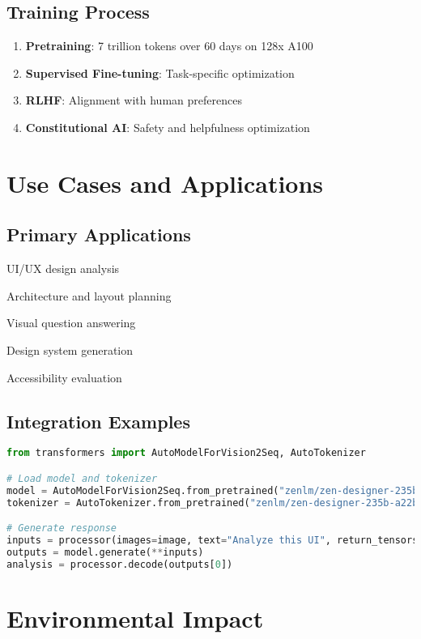 \documentclass[11pt,a4paper]{article}
\begin{document}
\subsection{Training Process}
\begin{enumerate}
    \item \textbf{Pretraining}: 7 trillion tokens over 60 days on 128x A100
    \item \textbf{Supervised Fine-tuning}: Task-specific optimization
    \item \textbf{RLHF}: Alignment with human preferences
    \item \textbf{Constitutional AI}: Safety and helpfulness optimization
\end{enumerate}

\section{Use Cases and Applications}

\subsection{Primary Applications}
\item UI/UX design analysis
\item Architecture and layout planning
\item Visual question answering
\item Design system generation
\item Accessibility evaluation

\subsection{Integration Examples}

\begin{lstlisting}[language=Python, caption=Basic Usage Example]
from transformers import AutoModelForVision2Seq, AutoTokenizer

# Load model and tokenizer
model = AutoModelForVision2Seq.from_pretrained("zenlm/zen-designer-235b-a22b-thinking")
tokenizer = AutoTokenizer.from_pretrained("zenlm/zen-designer-235b-a22b-thinking")

# Generate response
inputs = processor(images=image, text="Analyze this UI", return_tensors="pt")
outputs = model.generate(**inputs)
analysis = processor.decode(outputs[0])
\end{lstlisting}

\section{Environmental Impact}
\end{document}
